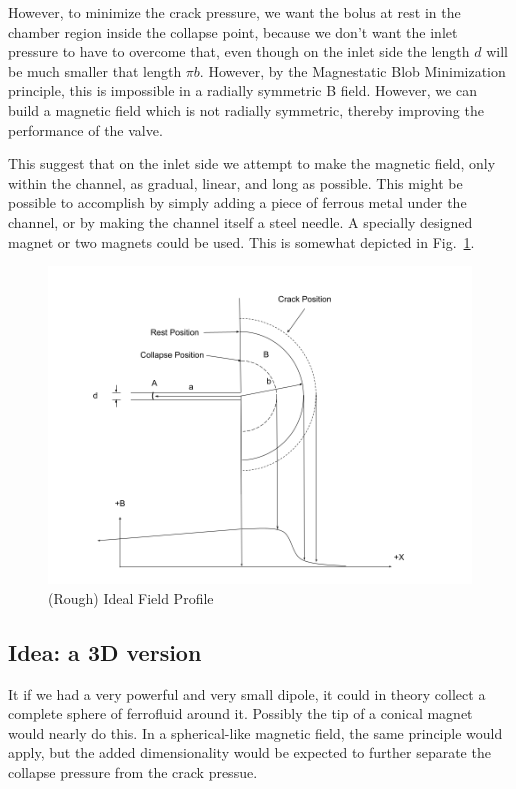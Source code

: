 \documentclass{asme2ej}
\begin{document}
However, to minimize the crack pressure, we want the bolus at rest
in the chamber region inside
the collapse point, because we don't want the inlet pressure to have
to overcome that, even though on the inlet side the length $d$ will
be much smaller that length $\pi b$. However, by the
Magnestatic Blob Minimization principle, this is impossible in a
radially symmetric B field. However, we can build a magnetic field
which is not radially symmetric, thereby improving the performance of the valve.

This suggest that on the inlet side we attempt to make
the magnetic field, only within the channel, as gradual, linear, and
long as possible. This might be possible to accomplish by simply adding
a piece of ferrous metal under the channel, or by making the channel
itself a steel needle. A specially designed magnet or two magnets could be
used. This is somewhat depicted in Fig.~\ref{fig:ifp}.

\begin{figure}
\centerline{\includegraphics[width=6in]{figure/IdealFieldProfile.png}}
\caption{(Rough) Ideal Field Profile}
\label{fig:ifp}
\end{figure}


\subsection{Idea: a 3D version}

It if we had a very powerful and very small dipole, it could in theory
collect a complete sphere of ferrofluid around it. Possibly the tip
of a conical magnet would nearly do this.
In a spherical-like magnetic field, the same principle would
apply, but the added dimensionality would be expected to further
separate the collapse pressure from the crack pressue.
\end{document}
